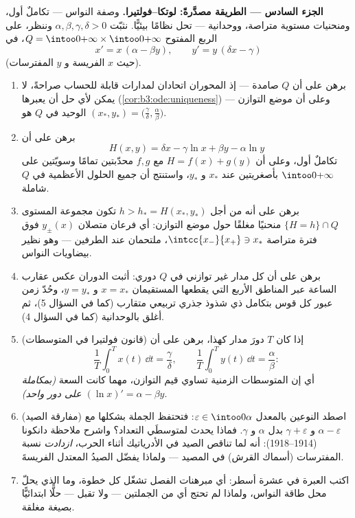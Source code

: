 \begin{problem}
\medskip
\noindent\textbf{الجزء السادس --- الطريقة مصدَّرةً:
لوتكا--فولتيرا.} وصفة النواس --- تكاملٌ أول، ومنحنيات مستوية
متراصة، ووحدانية --- تحل نظامًا بيئيًّا. نثبّت $\alpha, \beta, \gamma, \delta > 0$ وننظر،
على الربع المفتوح $Q = \intoo0{+\infty}\times\intoo0{+\infty}$، في
\[
x' = x\,(\alpha - \beta y), \qquad
y' = y\,(\delta x - \gamma)
\]
(حيث $x$ الفريسة و $y$ المفترسات).
\begin{enumerate}[resume]
  \item برهن على أن $Q$ صامدة --- إذ المحوران اتحادان لمدارات
        قابلة للحساب صراحةً، لا يمكن لأي حل أن يعبرها
        (\cref{cor:b3:ode:uniqueness}) --- وعلى أن موضع التوازن الوحيد في $Q$
        هو $(x_*, y_*) =
        \bigl(\frac\gamma\delta, \frac\alpha\beta\bigr)$.
  \item برهن على أن
        \[
        H(x, y) = \delta x - \gamma\ln x + \beta y -
        \alpha\ln y
        \]
        تكاملٌ أول، وعلى أن $H = f(x) + g(y)$ مع $f, g$ محدّبتين تمامًا
        وسويّتين على $\intoo0{+\infty}$ بأصغريتين عند $x_*$ و $y_*$،
        واستنتج أن جميع الحلول الأعظمية في $Q$ شاملة.
  \item برهن على أنه من أجل $h > h_* = H(x_*, y_*)$ تكون مجموعة المستوى $\{H = h\}\cap Q$
        منحنيًا مغلقًا حول موضع التوازن: أي فرعان متصلان
        $y_\pm(x)$ فوق فترة متراصة $\intcc{x_-}{x_+} \ni x_*$، ملتحمان عند
        الطرفين --- وهو نظير بيضاويات النواس.
  \item برهن على أن كل مدار غير توازني في $Q$ دوري: أثبت
        الدوران عكس عقارب الساعة عبر المناطق الأربع التي
        يقطعها المستقيمان $x = x_*$ و $y = y_*$، وحُدّ زمن
        عبور كل قوس بتكامل ذي شذوذ جذري تربيعي متقارب (كما في
        السؤال 5)، ثم أغلق بالوحدانية (كما في السؤال 4).
  \item (قانون فولتيرا في المتوسطات) إذا كان $T$ دورَ مدار
        كهذا، برهن على أن
        \[
        \frac1T\int_0^Tx(t)\,\dd t = \frac\gamma\delta,
        \qquad
        \frac1T\int_0^Ty(t)\,\dd t = \frac\alpha\beta :
        \]
        أي إن المتوسطات الزمنية تساوي قيم التوازن، مهما كانت
        السعة \emph{(بمكاملة $(\ln x)' =
        \alpha - \beta y$ على دور واحد)}.
  \item (مفارقة الصيد) اصطد النوعين بالمعدل $\varepsilon \in \intoo0\alpha$: فتحتفظ
        الجملة بشكلها مع $\alpha - \varepsilon$ و $\gamma +
        \varepsilon$ بدل $\alpha$
        و $\gamma$. فماذا يحدث لمتوسطَي التعداد؟ واشرح ملاحظة
        دانكونا (1914--1918): أنه لما تناقص الصيد في الأدرياتيك
        أثناء الحرب، \emph{ازدادت} نسبة المفترسات (أسماك
        القرش) في المصيد --- ولماذا يفضّل الصيدُ المعتدل
        الفريسةَ.
  \item اكتب العبرة في عشرة أسطر: أي مبرهنات الفصل تشغّل كل
        خطوة، وما الذي يحلّ محل طاقة النواس، ولماذا لم تحتج
        أي من الجملتين --- ولا تقبل --- حلًّا ابتدائيًّا
        بصيغة مغلقة.


\end{enumerate}
\end{problem}

